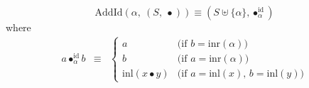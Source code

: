 \[ 
  \mathrm{AddId}(\alpha,\ (S,\ \bullet)) 
\equiv 
(S \uplus \{\alpha\}, \bullet_{\alpha}^{\mathrm{id}})
\] 
where 
\[
\begin{array}{rcl} 
a \bullet_{\alpha}^{\mathrm{id}} b 
& \equiv & 
\left\{\begin{array}{cl} 
      a & \mbox{(if $b = \mathrm{inr}(\alpha)$)} \\ 
      b & \mbox{(if $a = \mathrm{inr}(\alpha)$)} \\ 
      \mathrm{inl}(x\bullet y) & \mbox{(if $a = \mathrm{inl}(x)$, $b = \mathrm{inl}(y)$)} 
      \end{array} 
\right.
\end{array} 
\] 
